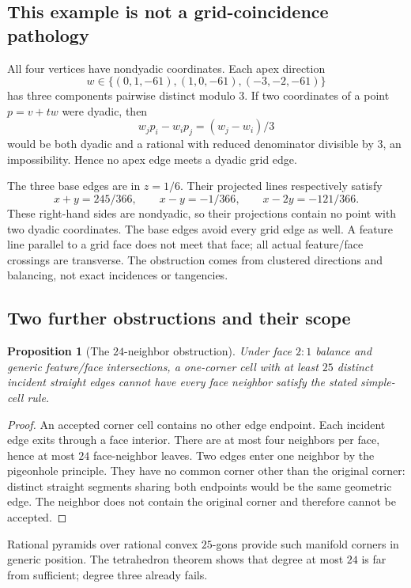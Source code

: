 \documentclass[11pt]{article}
\newtheorem{proposition}[theorem]{Proposition}
\theoremstyle{definition}
\theoremstyle{remark}
\begin{document}
\subsection{This example is not a grid-coincidence pathology}

All four vertices have nondyadic coordinates. Each apex direction
\[
  w\in\{(0,1,-61),(1,0,-61),(-3,-2,-61)\}
\]
has three components pairwise distinct modulo $3$.
If two coordinates of a point $p=v+tw$
were dyadic, then
\[
  w_jp_i-w_ip_j=(w_j-w_i)/3
\]
would be both dyadic and a rational with reduced denominator divisible
by $3$, an impossibility. Hence no apex edge meets a dyadic grid edge.

The three base edges are in $z=1/6$. Their projected lines respectively
satisfy
\[
  x+y=245/366,\qquad x-y=-1/366,\qquad x-2y=-121/366.
\]
These right-hand sides are nondyadic, so their projections contain no
point with two dyadic coordinates. The base edges avoid every grid edge
as well. A feature line parallel to a grid face does not meet that face;
all actual feature/face crossings are transverse. The obstruction comes
from clustered directions and balancing, not exact incidences or
tangencies.

\subsection{Two further obstructions and their scope}

\begin{proposition}[The $24$-neighbor obstruction]
\label{prop:valence}
Under face $2{:}1$ balance and generic feature/face intersections, a
one-corner cell with at least $25$ distinct incident straight edges
cannot have every face neighbor satisfy the stated simple-cell rule.
\end{proposition}

\begin{proof}
An accepted corner cell contains no other edge endpoint. Each incident
edge exits through a face interior. There are at most four neighbors
per face, hence at most $24$ face-neighbor leaves. Two edges enter one
neighbor by the pigeonhole principle. They have no common corner other
than the original corner: distinct straight segments sharing both
endpoints would be the same geometric edge. The neighbor does not
contain the original corner and therefore cannot be accepted.
\end{proof}

Rational pyramids over rational convex $25$-gons provide such manifold
corners in generic position. The tetrahedron theorem shows that degree
at most $24$ is far from sufficient; degree three already fails.
\end{document}
